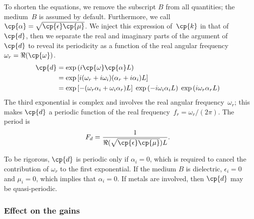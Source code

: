 To shorten the equations, we remove the subscript $B$ from all quantities; the medium~$B$ is assumed by default.
Furthermore, we call~$\cp{\alpha}=\sqrt{\cp{\epsilon} \cp{\mu}}$.
We inject this expression of~$\cp{k}$ in that of~$\cp{d}$, then we separate the real and imaginary parts of the argument of~$\cp{d}$ to reveal its periodicity as a function of the real angular frequency~$\omega_r = \Re(\cp{\omega})$.
\begin{subequations}
    \label{eq:distance_coefficient_expanded}
    \begin{align}
        \cp{d}
        &=
        \exp \left( i \cp{\omega} \cp{\alpha} L \right)
        \\
        &=
        \exp
        \left[
            i
            (\omega_r + i \omega_i) (\alpha_r + i \alpha_i)
            L
        \right]
        \\
        &=
        \exp
        \left[
            -
            (\omega_r \alpha_i + \omega_i \alpha_r)
            L
        \right]
        \;
        \exp
        \left(
            -i \omega_i \alpha_i L
        \right)
        \;
        \exp
        \left(
            i \omega_r \alpha_r L
        \right)
    \end{align}
\end{subequations}
The third exponential is complex and involves the real angular frequency~$\omega_r$;
this makes $\cp{d}$ a periodic function of the real frequency~$f_r=\omega_r/(2\pi)$.
The period is
\begin{equation}
    F_d = 
    \frac{1}{\Re(\sqrt{\cp{\epsilon}\cp{\mu}})L}
    \text{.}
\end{equation}

To be rigorous, $\cp{d}$ is periodic only if $\alpha_i=0$, which is required to cancel the contribution of $\omega_r$ to the first exponential.
If the medium $B$ is dielectric, $\epsilon_i=0$ and $\mu_i=0$, which implies that $\alpha_i=0$.
If metals are involved, then $\cp{d}$ may be quasi-periodic.




\subsubsection{Effect on the gains}
\label{sec:fabry_gain}

